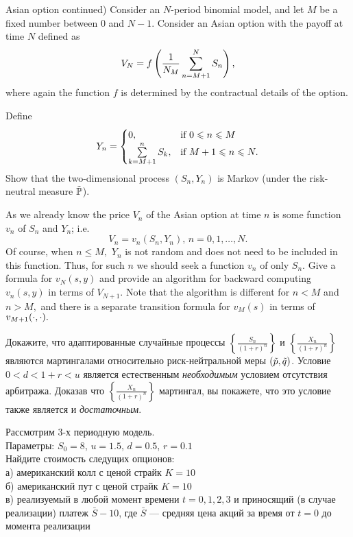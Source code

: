 \begin{problem}
 Asian option continued) Consider an $N$-period binomial model,
and let $M$ be a fixed number between $0$ and $N-1$. Consider an Asian option with the payoff
at time $N$ defined as
\[
V_N=f\left(\frac{1}{N_M}\sum\lims_{n=M+1}^{N} S_n \right),
\]
\ni where again the function $f$ is determined by the contractual details of the option.

Define
\[
Y_n=
\begin{cases}
0,&\text{if }0\le n\le M\\
\sum\lims_{k=M+1}^{n} S_k,&\text{if }M+1\le n\le N.
\end{cases}
\]
\ni Show that the two-dimensional process $(S_n,Y_n)$ is Markov
(under the risk-neutral measure $\tilde{\P}$).

As we already know the price $V_n$ of the Asian option at time $n$
is some function $v_n$ of $S_n$ and $Y_n$; i.e.
\[
V_n=v_n(S_n,Y_n),\, n=0,1,\dots,N.
\]
\ni Of course, when $n\le M,$ $Y_n$ is not random and does not need to be included
in this function. Thus, for such $n$ we should seek a function $v_n$ of only $S_n$.
\ni Give a formula for $v_N(s,y)$ and provide an algorithm for backward computing
$v_n(s,y)$ in terms of $V_{N+1}.$ Note that the algorithm is different for $n<M$
and $n>M,$ and there is a separate transition formula for $v_M(s)$ in terms of
$v_{M+1}(\cd,\cd).$

\begin{sol}

\end{sol}
\end{problem}

\begin{problem}
 Докажите, что адаптированные случайные процессы $\left\{ \frac{S_n}{(1+r)^n}\right\}$ и
  $\left\{ \frac{X_n}{(1+r)^n}\right\}$ являются мартингалами относительно риск-нейтральной
  меры $(\ti p, \ti q)$. Условие $0<d<1+r<u$ является естественным \emph{необходимым} условием
  отсутствия арбитража. Доказав что $\left\{ \frac{X_n}{(1+r)^n}\right\}$ мартингал, вы покажете,
  что это условие также является и \emph{достаточным}.

\begin{sol}

\end{sol}
\end{problem}

\begin{problem}
Рассмотрим 3-х периодную модель.\\
Параметры: $S_{0}=8$, $u=1.5$, $d=0.5$, $r=0.1$ \\
Найдите стоимость следущих опционов: \\
а) американский колл с ценой страйк $K=10$ \\
б) американский пут с ценой страйк $K=10$ \\
в) реализуемый в любой момент времени $t=0,1,2,3$ и приносящий (в случае реализации) платеж $\bar{S}-10$, где $\bar{S}$ — средняя цена акций за время от $t=0$ до момента реализации

\begin{sol}

\end{sol}
\end{problem}

